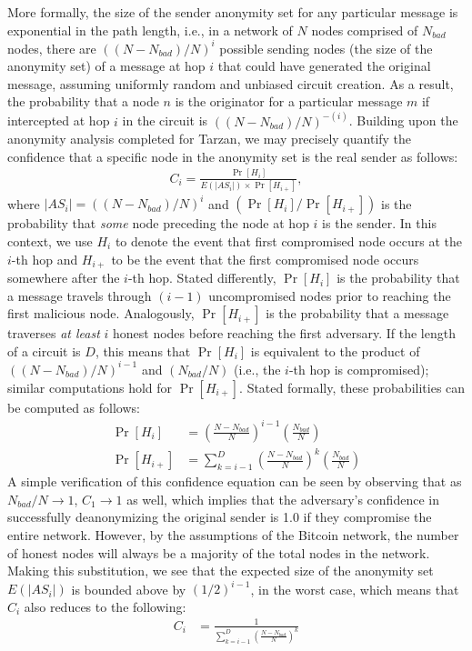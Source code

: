 More formally, the size of the sender anonymity set for any particular message is exponential in the path length, i.e., in a network of $N$ nodes comprised of $N_{bad}$ nodes, there are $((N - N_{bad}) / N)^{i}$ possible sending nodes (the size of the anonymity set) of a message at hop $i$ that could have generated the original message, assuming uniformly random and unbiased circuit creation. As a result, the probability that a node $n$ is the originator for a particular message $m$ if intercepted at hop $i$ in the circuit is $((N - N_{bad}) / N)^{-(i)}$. Building upon the anonymity analysis completed for Tarzan, we may precisely quantify the confidence that a specific node in the anonymity set is the real sender as follows:
\begin{align*}
C_i = \frac{\Pr[H_i]}{E(|AS_i|) \times \Pr[H_{i+}]},
\end{align*} 
where $|AS_i| = ((N - N_{bad}) / N)^{i}$ and $(\Pr[H_i] / \Pr[H_{i+}])$ is the probability that \emph{some} node preceding the node at hop $i$ is the sender. In this context, we use $H_i$ to denote the event that first compromised node occurs at the $i$-th hop and $H_{i+}$ to be the event that the first compromised node occurs somewhere after the $i$-th hop. Stated differently, $\Pr[H_i]$ is the probability that a message travels through $(i-1)$ uncompromised nodes prior to reaching the first malicious node. Analogously, $\Pr[H_{i+}]$ is the probability that a message traverses \emph{at least} $i$ honest nodes before reaching the first adversary. If the length of a circuit is $D$, this means that $\Pr[H_i]$ is equivalent to the product of $((N - N_{bad}) / N)^{i-1}$ and $(N_{bad} / N)$ (i.e., the $i$-th hop is compromised); similar computations hold for $\Pr[H_{i+}]$. Stated formally, these probabilities can be computed as follows:
\begin{align*}
\Pr[H_i] & = \left(\frac{N - N_{bad}}{N}\right)^{i-1} \left( \frac{N_{bad}}{N}\right) \\
\Pr[H_{i+}] & = \sum_{k=i-1}^{D} \left(\frac{N - N_{bad}}{N}\right)^{k} \left( \frac{N_{bad}}{N}\right)
\end{align*}
A simple verification of this confidence equation can be seen by observing that as $N_{bad}/N \to 1$,  $C_1 \to 1$ as well, which implies that the adversary's confidence in successfully deanonymizing the original sender is 1.0 if they compromise the entire network. However, by the assumptions of the Bitcoin network, the number of honest nodes will always be a majority of the total nodes in the network. Making this substitution, we see that the expected size of the anonymity set $E(|AS_i|)$ is bounded above by $\left(1/2\right)^{i-1}$, in the worst case, which means that $C_i$ also reduces to the following:
\begin{align*}
C_i & = \frac{1}{\sum_{k=i-1}^{D} \left(\frac{N - N_{bad}}{N}\right)^{k}}
\end{align*}

